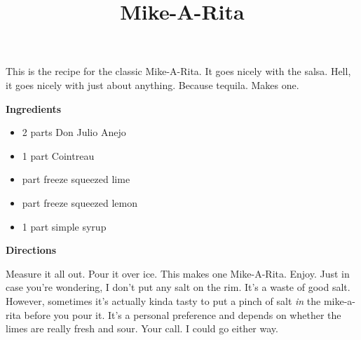 \documentclass{article}
\title{Mike-A-Rita}
\begin{document}
This is the recipe for the classic Mike-A-Rita. It goes nicely with the salsa. Hell, it goes nicely
with just about anything. Because tequila. Makes one.

\bigskip

\bigskip

\textbf{Ingredients}

\begin{itemize}
    \item 2 parts Don Julio Anejo
    \item 1 part Cointreau
    \item {} part freeze squeezed lime
    \item {} part freeze squeezed lemon
    \item 1 part simple syrup
\end{itemize}

\bigskip

\textbf{Directions}

Measure it all out. Pour it over ice. This makes one Mike-A-Rita. Enjoy. Just in case you're
wondering, I don't put any salt on the rim. It's a waste of good salt. However, sometimes
it's actually kinda tasty to put a pinch of salt \textit{in} the mike-a-rita before you
pour it. It's a personal preference and depends on whether the limes are really fresh
and sour. Your call. I could go either way.

\end{document}
